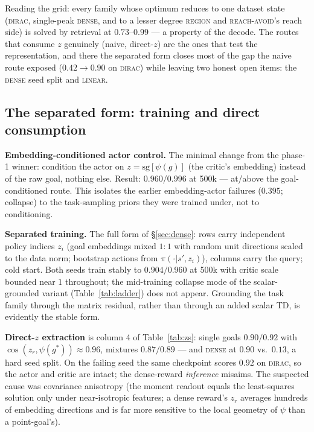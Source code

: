 \documentclass[10pt]{article}
\newcommand{\sg}{\mathrm{sg}}
\begin{document}
Reading the grid: every family whose optimum reduces to one dataset state
(\textsc{dirac}, single-peak \textsc{dense}, and to a lesser degree \textsc{region}
and \textsc{reach-avoid}'s reach side) is solved by retrieval at $0.73$--$0.99$ ---
a property of the decode.
The routes that consume $z$ genuinely (naive, direct-$z$) are the ones that test the
representation, and there the separated form closes most of the gap the naive route
exposed ($0.42\to0.90$ on \textsc{dirac}) while leaving two honest open items: the
\textsc{dense} seed split and \textsc{linear}.

\subsection{The separated form: training and direct consumption}
\label{sec:exp-sep}

\textbf{Embedding-conditioned actor control.}
The minimal change from the phase-1 winner: condition the actor on
$z=\sg[\psi(g)]$ (the critic's embedding) instead of the raw goal, nothing else.
Result: $0.960/0.996$ at 500k --- at/above the goal-conditioned route.
This isolates the earlier embedding-actor failures ($0.395$; collapse) to the
task-sampling priors they were trained under, not to conditioning.

\textbf{Separated training.}
The full form of \S\ref{sec:dense}: rows carry independent policy indices
$z_i$ (goal embeddings mixed $1{:}1$ with random unit directions scaled to the data
norm; bootstrap actions from $\pi(\cdot|s',z_i)$), columns carry the query;
cold start.
Both seeds train stably to $\mathbf{0.904/0.960}$ at 500k with critic scale bounded
near $1$ throughout; the mid-training collapse mode of the scalar-grounded variant
(Table~\ref{tab:ladder}) does not appear.
Grounding the task family through the matrix residual, rather than through an added
scalar TD, is evidently the stable form.

\textbf{Direct-$z$ extraction} is column 4 of Table~\ref{tab:zs}: single goals
$0.90/0.92$ with $\cos(z_r,\psi(g^{*}))\approx 0.96$, mixtures $0.87/0.89$ ---
and \textsc{dense} at $0.90$ vs.\ $0.13$, a hard seed split.
On the failing seed the same checkpoint scores $0.92$ on \textsc{dirac}, so the
actor and critic are intact; the dense-reward \emph{inference} misaims.
The suspected cause was covariance anisotropy (the moment readout equals the
least-squares solution only under near-isotropic features; a dense reward's $z_r$
averages hundreds of embedding directions and is far more sensitive to the local
geometry of $\psi$ than a point-goal's).
\end{document}
